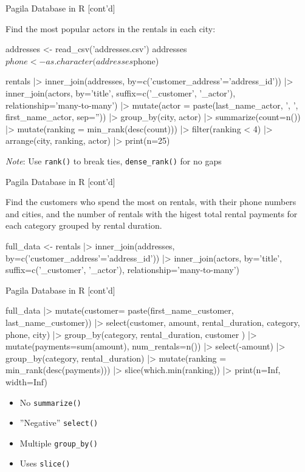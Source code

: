 \documentclass[ignorenonframetext,xcolor=x11names]{beamer}
\begin{document}
\begin{frame}[fragile]{Pagila Database in R \small [cont'd]}

Find the most popular actors in the rentals in each city:

\scriptsize
\begin{Rcode}
addresses <- read_csv('addresses.csv')
addresses$phone <- as.character(addresses$phone)

rentals |> 
   inner_join(addresses,
       by=c('customer_address'='address_id')) |>
   inner_join(actors,
       by='title',
       suffix=c('_customer', '_actor'),
       relationship='many-to-many') |>
   mutate(actor = 
       paste(last_name_actor, ', ', 
       first_name_actor, sep='')) |>
   group_by(city, actor) |>
   summarize(count=n()) |>
   mutate(ranking = min_rank(desc(count))) |>
   filter(ranking < 4) |>
   arrange(city, ranking, actor) |>
   print(n=25)
\end{Rcode}

\normalsize
\emph{Note}: Use \texttt{rank()} to break ties, \texttt{dense\_rank()} for no gaps
\end{frame}

\begin{frame}[fragile]{Pagila Database in R \small [cont'd]}

Find the customers who spend the most on rentals, with their phone numbers and cities, and the number of rentals with the higest total rental payments for each category grouped by rental duration.

\footnotesize
\begin{Rcode}
full_data <- 
   rentals |> 
     inner_join(addresses,
       by=c('customer_address'='address_id')) |>
     inner_join(actors,
       by='title',
       suffix=c('_customer', '_actor'),
       relationship='many-to-many')
\end{Rcode}
\end{frame}

\begin{frame}[fragile]{Pagila Database in R \small [cont'd]}
\footnotesize
\begin{Rcode}
full_data |>
   mutate(customer=
     paste(first_name_customer, last_name_customer)) |>
   select(customer, amount, rental_duration, 
          category, phone, city) |>
   group_by(category, rental_duration, customer ) |>
   mutate(payments=sum(amount), num_rentals=n()) |>
   select(-amount) |>
   group_by(category, rental_duration) |>
   mutate(ranking = min_rank(desc(payments))) |>
   slice(which.min(ranking)) |>
   print(n=Inf, width=Inf)
\end{Rcode}
\normalsize

\begin{itemize}
  \item No \texttt{summarize()}
  \item ''Negative'' \texttt{select()}
  \item Multiple \texttt{group\_by()}
  \item Uses \texttt{slice()}
\end{itemize}
\end{frame}
\end{document}
